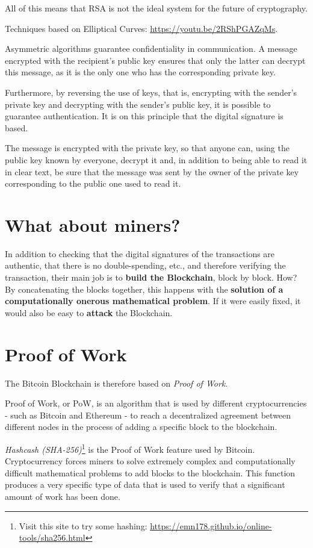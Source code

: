 All of this means that RSA is not the ideal system for the future of cryptography.

Techniques based on Elliptical Curves: \url{https://youtu.be/2RShPGAZqMs}.

Asymmetric algorithms guarantee confidentiality in communication. A message encrypted with the recipient's public key ensures that only the latter can decrypt this message, as it is the only one who has the corresponding private key.

Furthermore, by reversing the use of keys, that is, encrypting with the sender's private key and decrypting with the sender's public key, it is possible to guarantee authentication. It is on this principle that the digital signature is based.

The message is encrypted with the private key, so that anyone can, using the public key known by everyone, decrypt it and, in addition to being able to read it in clear text, be sure that the message was sent by the owner of the private key corresponding to the public one used to read it.

\section{What about miners?}

In addition to checking that the digital signatures of the transactions are authentic, that there is no double-spending, etc., and therefore verifying the transaction, their main job is to \textbf{build the Blockchain}, block by block. How? By concatenating the blocks together, this happens with the \textbf{solution of a computationally onerous mathematical problem}. If it were easily fixed, it would also be easy to \textbf{attack} the Blockchain.

\section{Proof of Work}

The Bitcoin Blockchain is therefore based on \textit{Proof of Work}.

Proof of Work, or PoW, is an algorithm that is used by different cryptocurrencies - such as Bitcoin and Ethereum - to reach a decentralized agreement between different nodes in the process of adding a specific block to the blockchain.

\textit{Hashcash (SHA-256)}\footnote{Visit this site to try some hashing: \url{https://emn178.github.io/online-tools/sha256.html}} is the Proof of Work feature used by Bitcoin. Cryptocurrency forces miners to solve extremely complex and computationally difficult mathematical problems to add blocks to the blockchain. This function produces a very specific type of data that is used to verify that a significant amount of work has been done.

